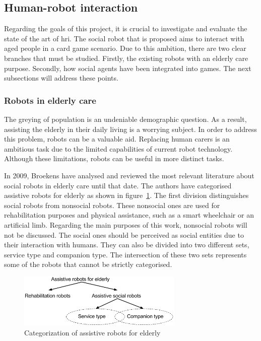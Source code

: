 \subsection{Human-robot interaction}

Regarding the goals of this project, it is crucial to investigate and evaluate the state of the art of \gls{hri}.
The social robot that is proposed aims to interact with aged people in a card game scenario.
Due to this ambition, there are two clear branches that must be studied.
Firstly, the existing robots with an elderly care purpose.
Secondly, how social agents have been integrated into games.
The next subsections will address these points.



\subsubsection{Robots in elderly care}


The greying of population is an undeniable demographic question.
As a result, assisting the elderly in their daily living is a worrying subject.
In order to address this problem, robots can be a valuable aid.
Replacing human carers is an ambitious task due to the limited capabilities of current robot technology.
Although these limitations, robots can be useful in more distinct tasks.

In 2009, Broekens have analysed and reviewed the most relevant literature about social robots in elderly care until that date.
The authors have categorised assistive robots for elderly as shown in figure~\ref{fig:categorization}.
The first division distinguishes social robots from nonsocial robots.
These nonsocial ones are used for rehabilitation purposes and physical assistance, such as a smart wheelchair or an artificial limb.
Regarding the main purposes of this work, nonsocial robots will not be discussed.
The social ones should be perceived as social entities due to their interaction with humans.
They can also be divided into two different sets, service type and companion type.
The intersection of these two sets represents some of the robots that cannot be strictly categorised.

\begin{figure}[h!]
  \centering
    \includegraphics[width=0.7\textwidth]{./img/categorization_robots}
  \caption{Categorization of assistive robots for elderly}
\label{fig:categorization}
\end{figure}

